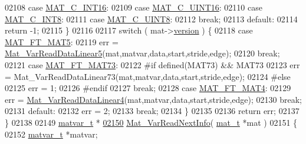 \begin{DoxyCode}
{{{{{{{{{{{{{{{{{{{{{{{{{{{{{{{{{{{{{{{{{{{02108         \textcolor{keywordflow}{case} \hyperlink{group___m_a_t_ggad4d60ae7b709fc81bfd744fb4c857c40a40370e9de516c5036a67a5865c071006}{MAT\_C\_INT16}:
02109         \textcolor{keywordflow}{case} \hyperlink{group___m_a_t_ggad4d60ae7b709fc81bfd744fb4c857c40a8bede21dbf6c1edc0bbccc1481bccae7}{MAT\_C\_UINT16}:
02110         \textcolor{keywordflow}{case} \hyperlink{group___m_a_t_ggad4d60ae7b709fc81bfd744fb4c857c40a984ff310f9e906100fcff95f704f43c5}{MAT\_C\_INT8}:
02111         \textcolor{keywordflow}{case} \hyperlink{group___m_a_t_ggad4d60ae7b709fc81bfd744fb4c857c40a81270f8093cb4808e992c1d29d84d4e3}{MAT\_C\_UINT8}:
02112             \textcolor{keywordflow}{break};
02113         \textcolor{keywordflow}{default}:
02114             \textcolor{keywordflow}{return} -1;
02115     \}
02116 
02117     \textcolor{keywordflow}{switch} ( mat->\hyperlink{struct__mat__t_a729c2bc0afc97485057a5af425635b1a}{version} ) \{
02118         \textcolor{keywordflow}{case} \hyperlink{group___m_a_t_ggad03442b8378999189d510e3745c702b7a31ade1f6989411dc0299007e2c7d33b2}{MAT\_FT\_MAT5}:
02119             err = \hyperlink{group___m_a_t_ga9c81a102772919ad4841c37e4907e712}{Mat\_VarReadDataLinear5}(mat,matvar,data,start,stride,edge);
02120             \textcolor{keywordflow}{break};
02121         \textcolor{keywordflow}{case} \hyperlink{group___m_a_t_ggad03442b8378999189d510e3745c702b7a765c5d1d5038947646260dc82483517e}{MAT\_FT\_MAT73}:
02122 \textcolor{preprocessor}{#if defined(MAT73) && MAT73}
02123             err = Mat\_VarReadDataLinear73(mat,matvar,data,start,stride,edge);
02124 \textcolor{preprocessor}{#else}
02125             err = 1;
02126 \textcolor{preprocessor}{#endif}
02127             \textcolor{keywordflow}{break};
02128         \textcolor{keywordflow}{case} \hyperlink{group___m_a_t_ggad03442b8378999189d510e3745c702b7a858b4f5da65548219b1c3ad47aa478d3}{MAT\_FT\_MAT4}:
02129             err = \hyperlink{group___m_a_t_gab9f3d6b362bfa1fa92ed2afb8281cff4}{Mat\_VarReadDataLinear4}(mat,matvar,data,start,stride,edge);
02130             \textcolor{keywordflow}{break};
02131         \textcolor{keywordflow}{default}:
02132             err = 2;
02133             \textcolor{keywordflow}{break};
02134     \}
02135 
02136     \textcolor{keywordflow}{return} err;
02137 \}
02138 
02149 \hyperlink{group___m_a_t_structmatvar__t}{matvar\_t} *
\hyperlink{group___m_a_t_ga72dd99330507b17177e22f9ed3bea5e6}{02150} \hyperlink{group___m_a_t_ga72dd99330507b17177e22f9ed3bea5e6}{Mat\_VarReadNextInfo}( \hyperlink{struct__mat__t}{mat\_t} *mat )
02151 \{
02152     \hyperlink{group___m_a_t_structmatvar__t}{matvar\_t} *matvar;
}}}}}}}}}}}}}}}}}}}}}}}}}}}}}}}}}}}}}}}}}}}
\end{DoxyCode}
